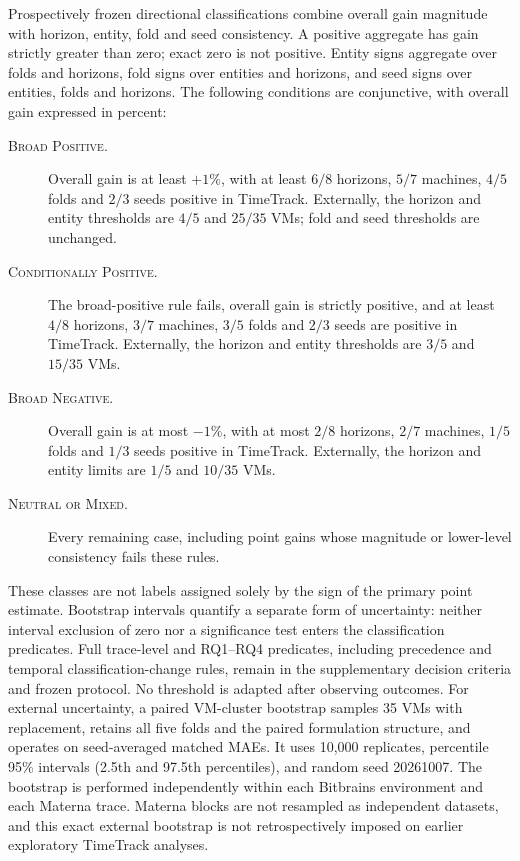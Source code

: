 \documentclass[a4paper,fleqn]{cas-dc}
\begin{document}
Prospectively frozen directional classifications combine overall gain
magnitude with horizon, entity, fold and seed consistency. A positive
aggregate has gain strictly greater than zero; exact zero is not positive.
Entity signs aggregate over folds and horizons, fold signs over entities and
horizons, and seed signs over entities, folds and horizons. The following
conditions are conjunctive, with overall gain expressed in percent:
\begin{description}
  \item[\textsc{Broad Positive}.] Overall gain is at least $+1\%$, with at
    least $6/8$ horizons, $5/7$ machines, $4/5$ folds and $2/3$ seeds positive
    in TimeTrack. Externally, the horizon and entity thresholds are $4/5$
    and $25/35$ VMs; fold and seed thresholds are unchanged.
  \item[\textsc{Conditionally Positive}.] The broad-positive rule fails,
    overall gain is strictly positive, and at least $4/8$ horizons, $3/7$
    machines, $3/5$ folds and $2/3$ seeds are positive in TimeTrack.
    Externally, the horizon and entity thresholds are $3/5$ and $15/35$ VMs.
  \item[\textsc{Broad Negative}.] Overall gain is at most $-1\%$, with at
    most $2/8$ horizons, $2/7$ machines, $1/5$ folds and $1/3$ seeds positive
    in TimeTrack. Externally, the horizon and entity limits are $1/5$
    and $10/35$ VMs.
  \item[\textsc{Neutral or Mixed}.] Every remaining case, including point
    gains whose magnitude or lower-level consistency fails these rules.
\end{description}
These classes are not labels assigned solely by the sign of the primary
point estimate. Bootstrap intervals quantify a separate form of uncertainty:
neither interval exclusion of zero nor a significance test enters the
classification predicates. Full trace-level and RQ1--RQ4 predicates,
including precedence and temporal classification-change rules, remain in the
supplementary decision criteria and frozen protocol. No threshold is adapted
after observing outcomes.
For external uncertainty, a paired VM-cluster bootstrap samples 35 VMs with
replacement, retains all five folds and the paired formulation structure, and
operates on seed-averaged matched MAEs.  It uses 10,000 replicates, percentile
95\% intervals (2.5th and 97.5th percentiles), and random seed 20261007.  The
bootstrap is performed independently within each Bitbrains environment and
each Materna trace.  Materna blocks are not resampled as independent datasets,
and this exact external bootstrap is not retrospectively imposed on earlier
exploratory TimeTrack analyses.
\end{document}

